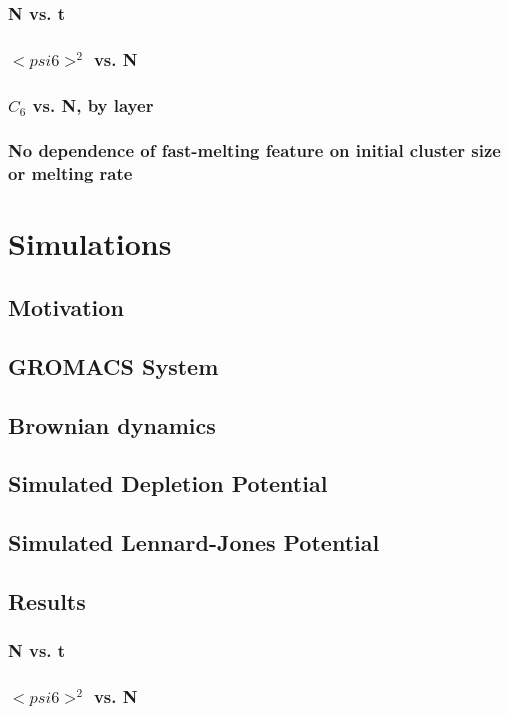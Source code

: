 \documentclass{umthesis}
\begin{document}
\subsubsection{N vs. t}
\label{sec-1.2.3.1}
\subsubsection{$< psi6 >^2$ vs. N}
\label{sec-1.2.3.2}
\subsubsection{$C_6$ vs. N, by layer}
\label{sec-1.2.3.3}
\subsubsection{No dependence of fast-melting feature on initial cluster size or melting rate}
\label{sec-1.2.3.4}
\section{Simulations}
\label{sec-1.3}
\subsection{Motivation}
\label{sec-1.3.1}
\subsection{GROMACS System}
\label{sec-1.3.2}
\subsection{Brownian dynamics}
\label{sec-1.3.3}
\subsection{Simulated Depletion Potential}
\label{sec-1.3.4}
\subsection{Simulated Lennard-Jones Potential}
\label{sec-1.3.5}
\subsection{Results}
\label{sec-1.3.6}
\subsubsection{N vs. t}
\label{sec-1.3.6.1}
\subsubsection{$< psi6 >^2$ vs. N}
\label{sec-1.3.6.2}
\end{document}
